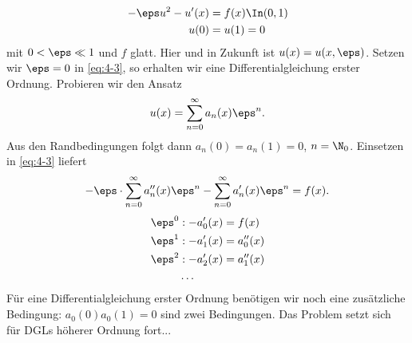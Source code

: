 \begin{beispiel}\label{ex:4-3}
  \begin{align}\label{eq:4-3}
    - \eps u^{2} -u'(x)  &= f(x) \In (0, 1)\\
    u(0) &= u(1) = 0 \notag
  \end{align}
  mit $0 < \eps \ll 1$ und $f$ glatt. Hier und in Zukunft ist $u(x) = u(x, \eps)$. Setzen wir $\eps = 0$ in \eqref{eq:4-3}, so erhalten wir eine Differentialgleichung erster Ordnung. Probieren wir den Ansatz 
  \begin{align*}
    u(x) = \sum_{n = 0}^{\infty} a_{n}(x) \eps^{n}. 
  \end{align*}
  Aus den Randbedingungen folgt dann $a_{n}(0) = a_{n}(1) = 0$, $n = \N_{0}$. Einsetzen in \eqref{eq:4-3} liefert
  \begin{align*}
    - \eps \cdot \sum_{n = 0}^{\infty} a_{n}''(x) \eps^{n} - \sum_{n = 0}^{\infty} a_{n}'(x) \eps^{n} = f(x). 
  \end{align*}
  \begin{align*}
    \eps^{0} &: -a_{0}'(x) = f(x)\\
    \eps^{1} &: -a_{1}'(x) = a_{0}''(x)\\
    \eps^{2} &: -a_{2}'(x) = a_{1}''(x)\\
    &\dots
  \end{align*}
  Für eine Differentialgleichung erster Ordnung benötigen wir noch eine zusätzliche Bedingung: $a_{0}(0)a_{0}(1) = 0$ sind zwei Bedingungen. Das Problem setzt sich für DGLs höherer Ordnung fort...


\end{beispiel}
